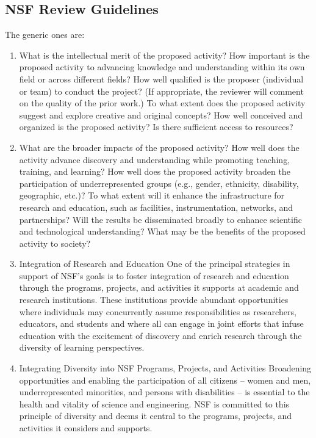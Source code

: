 \subsection{NSF Review Guidelines}

The generic ones are:

\begin{enumerate}
\item What is the intellectual merit of the proposed activity?  How
important is the proposed activity to advancing knowledge and understanding
within its own field or across different fields? How well qualified is the
proposer (individual or team) to conduct the project? (If appropriate, the
reviewer will comment on the quality of the prior work.) To what extent
does the proposed activity suggest and explore creative and original
concepts? How well conceived and organized is the proposed activity? Is
there sufficient access to resources?

\item What are the broader impacts of the proposed activity?  How well does
the activity advance discovery and understanding while promoting teaching,
training, and learning? How well does the proposed activity broaden the
participation of underrepresented groups (e.g., gender, ethnicity,
disability, geographic, etc.)? To what extent will it enhance the
infrastructure for research and education, such as facilities,
instrumentation, networks, and partnerships? Will the results be
disseminated broadly to enhance scientific and technological understanding?
What may be the benefits of the proposed activity to society?

\item Integration of Research and Education One of the principal strategies
in support of NSF's goals is to foster integration of research and
education through the programs, projects, and activities it supports at
academic and research institutions. These institutions provide abundant
opportunities where individuals may concurrently assume responsibilities as
researchers, educators, and students and where all can engage in joint
efforts that infuse education with the excitement of discovery and enrich
research through the diversity of learning perspectives.

\item Integrating Diversity into NSF Programs, Projects, and Activities
Broadening opportunities and enabling the participation of all citizens --
women and men, underrepresented minorities, and persons with disabilities
-- is essential to the health and vitality of science and engineering. NSF
is committed to this principle of diversity and deems it central to the
programs, projects, and activities it considers and supports.

\end{enumerate}

